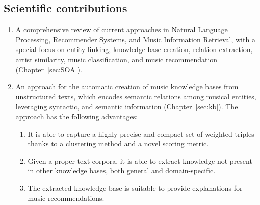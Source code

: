 \subsection{Scientific contributions}

\begin{enumerate}

\item 
A comprehensive review of current approaches in Natural Language Processing, Recommender Systems, and Music Information Retrieval, with a special focus on entity linking, knowledge base creation, relation extraction, artist similarity, music classification, and music recommendation (Chapter~\ref{sec:SOA}).


\item 
An approach for the automatic creation of music knowledge bases from unstructured texts, which encodes semantic relations among musical entities, leveraging syntactic, and semantic information (Chapter~\ref{sec:kb}). %
The approach has the following advantages:

\begin{enumerate}
\item 
It is able to capture a highly precise and compact set of weighted triples thanks to a clustering method and a novel scoring metric. 
\item 
Given a proper text corpora, it is able to extract knowledge not present in other knowledge bases, both general and domain-specific. 
\item
The extracted knowledge base is suitable to provide explanations for music recommendations.
\end{enumerate}


\end{enumerate}
